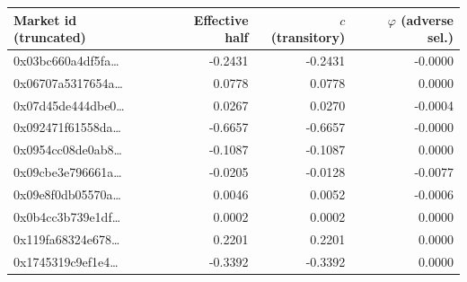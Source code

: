 \begin{tabular}{lrrr}
\toprule
Market id (truncated) & Effective half & $c$ (transitory) & $\varphi$ (adverse sel.) \\
\midrule
0x03bc660a4df5fa\ldots & -0.2431 & -0.2431 & -0.0000 \\
0x06707a5317654a\ldots & 0.0778 & 0.0778 & 0.0000 \\
0x07d45de444dbe0\ldots & 0.0267 & 0.0270 & -0.0004 \\
0x092471f61558da\ldots & -0.6657 & -0.6657 & -0.0000 \\
0x0954cc08de0ab8\ldots & -0.1087 & -0.1087 & 0.0000 \\
0x09cbe3e796661a\ldots & -0.0205 & -0.0128 & -0.0077 \\
0x09e8f0db05570a\ldots & 0.0046 & 0.0052 & -0.0006 \\
0x0b4cc3b739e1df\ldots & 0.0002 & 0.0002 & 0.0000 \\
0x119fa68324e678\ldots & 0.2201 & 0.2201 & 0.0000 \\
0x1745319c9ef1e4\ldots & -0.3392 & -0.3392 & 0.0000 \\
\bottomrule
\end{tabular}
